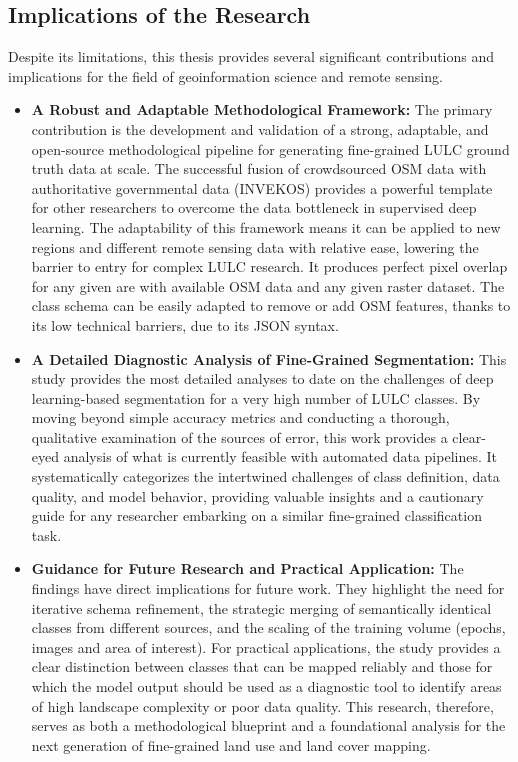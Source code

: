 \documentclass{report}
\begin{document}
\subsection{Implications of the Research}
Despite its limitations, this thesis provides several significant contributions and implications for the field of geoinformation science and remote sensing.
\begin{itemize}
\item \textbf{A Robust and Adaptable Methodological Framework:} The primary contribution is the development and validation of a strong, adaptable, and open-source methodological pipeline for generating fine-grained LULC ground truth data at scale. The successful fusion of crowdsourced OSM data with authoritative governmental data (INVEKOS) provides a powerful template for other researchers to overcome the data bottleneck in supervised deep learning. The adaptability of this framework means it can be applied to new regions and different remote sensing data with relative ease, lowering the barrier to entry for complex LULC research. It produces perfect pixel overlap for any given are with available OSM data and any given raster dataset. The class schema can be easily adapted to remove or add OSM features, thanks to its low technical barriers, due to its JSON syntax.
\item \textbf{A Detailed Diagnostic Analysis of Fine-Grained Segmentation:} This study provides the most detailed analyses to date on the challenges of deep learning-based segmentation for a very high number of LULC classes. By moving beyond simple accuracy metrics and conducting a thorough, qualitative examination of the sources of error, this work provides a clear-eyed analysis of what is currently feasible with automated data pipelines. It systematically categorizes the intertwined challenges of class definition, data quality, and model behavior, providing valuable insights and a cautionary guide for any researcher embarking on a similar fine-grained classification task.
\item \textbf{Guidance for Future Research and Practical Application:} The findings have direct implications for future work. They highlight the need for iterative schema refinement, the strategic merging of semantically identical classes from different sources, and the scaling of the training volume (epochs, images and area of interest). For practical applications, the study provides a clear distinction between classes that can be mapped reliably and those for which the model output should be used as a diagnostic tool to identify areas of high landscape complexity or poor data quality. This research, therefore, serves as both a methodological blueprint and a foundational analysis for the next generation of fine-grained land use and land cover mapping.
\end{itemize}
\end{document}
